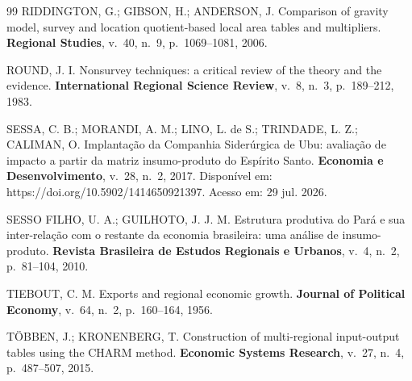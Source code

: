 \documentclass[11pt,a4paper]{article}
\begin{document}
\begin{thebibliography}{99}
RIDDINGTON, G.; GIBSON, H.; ANDERSON, J. Comparison of gravity model, survey and
location quotient-based local area tables and multipliers. \textbf{Regional
Studies}, v.~40, n.~9, p.~1069--1081, 2006.

ROUND, J. I. Nonsurvey techniques: a critical review of the theory and the
evidence. \textbf{International Regional Science Review}, v.~8, n.~3,
p.~189--212, 1983.

SESSA, C. B.; MORANDI, A. M.; LINO, L. de S.; TRINDADE, L. Z.; CALIMAN, O.
Implantação da Companhia Siderúrgica de Ubu: avaliação de impacto a partir da
matriz insumo-produto do Espírito Santo. \textbf{Economia e Desenvolvimento},
v.~28, n.~2, 2017. Disponível em: https://doi.org/10.5902/1414650921397.
Acesso em: 29 jul. 2026.

SESSO FILHO, U. A.; GUILHOTO, J. J. M. Estrutura produtiva do Pará e sua
inter-relação com o restante da economia brasileira: uma análise de
insumo-produto. \textbf{Revista Brasileira de Estudos Regionais e Urbanos}, v.~4,
n.~2, p.~81--104, 2010.

TIEBOUT, C. M. Exports and regional economic growth. \textbf{Journal of Political
Economy}, v.~64, n.~2, p.~160--164, 1956.

TÖBBEN, J.; KRONENBERG, T. Construction of multi-regional input-output tables
using the CHARM method. \textbf{Economic Systems Research}, v.~27, n.~4,
p.~487--507, 2015.

\end{thebibliography}
\end{document}
